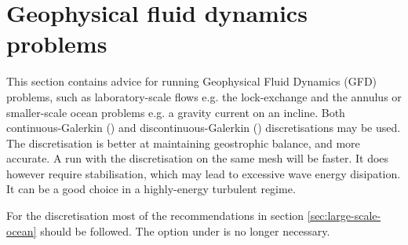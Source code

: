 
\section{Geophysical fluid dynamics problems}
\label{sec:gfd_problems}

This section contains advice for running Geophysical Fluid Dynamics (GFD) problems, such as laboratory-scale flows e.g. the lock-exchange and the annulus or smaller-scale ocean problems e.g. a gravity current on an incline. 
  Both continuous-Galerkin (\Poo) and discontinuous-Galerkin (\PoDGPt)
discretisations may be used. The \PoDGPt discretisation is better at
maintaining geostrophic balance, and more accurate. A run with the \Poo
discretisation on the same mesh will be faster. It does however require
stabilisation, which may lead to excessive wave energy disipation. It can be a
good choice in a highly-energy turbulent regime.

For the \PoDGPt discretisation most of the recommendations in section
\ref{sec:large-scale-ocean} should be followed. The option
 under  is no longer
necessary.


